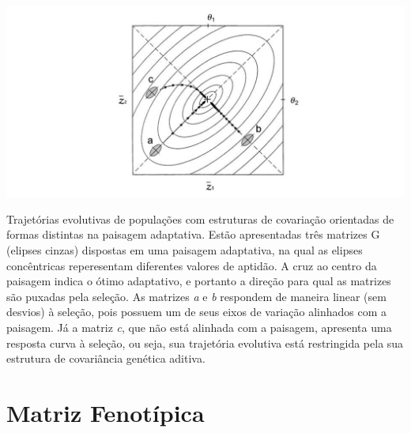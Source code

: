 \documentclass[portuges,]{tufte-handout}
\begin{document}
\begin{marginfigure}
\includegraphics{./figuras/desvio-trajetorias.png}
\caption{Trajetórias evolutivas de populações com estruturas de
covariação orientadas de formas distintas na paisagem adaptativa. Estão
apresentadas três matrizes G (elipses cinzas) dispostas em uma paisagem
adaptativa, na qual as elipses concêntricas reperesentam diferentes
valores de aptidão. A cruz ao centro da paisagem indica o ótimo
adaptativo, e portanto a direção para qual as matrizes são puxadas pela
seleção. As matrizes \emph{a} e \emph{b} respondem de maneira linear
(sem desvios) à seleção, pois possuem um de seus eixos de variação
alinhados com a paisagem. Já a matriz \emph{c}, que não está alinhada
com a paisagem, apresenta uma resposta curva à seleção, ou seja, sua
trajetória evolutiva está restringida pela sua estrutura de covariância
genética aditiva.}
\label{desvio-trajetorias}
\end{marginfigure}

\section{Matriz Fenotípica}\label{matriz-fenotuxedpica}
\end{document}
